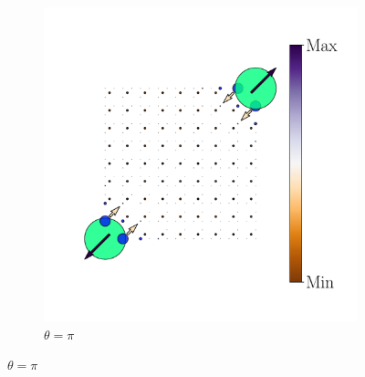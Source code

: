 \begin{figure}[h!]
\begin{minipage}[h!]{1.1\textwidth}
\begin{subfigure}[b!]{0.2 \textwidth}
         \end{subfigure}\hspace*{-0.5em}
          \begin{subfigure}[b!]{0.2 \textwidth}
             \caption*{$\theta = \pi$}
             \includegraphics[width=\textwidth]{Imagenes/Resultados_pump_Cuadrado/xy/hoti_pomp_xy_pos5.pdf}
         \end{subfigure}\hspace*{-0.5em}
     \end{minipage}\vspace*{-1em}
     

\end{figure}
